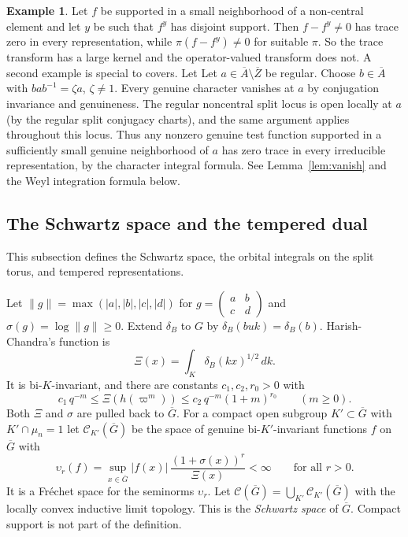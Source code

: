 \documentclass[12pt,letterpaper]{article}
\numberwithin{equation}{section}
\theoremstyle{definition}
\newtheorem{xexample}[theorem]{Example}
\newcommand{\vp}{\varpi}
\newcommand{\bG}{\overline{G}}
\newcommand{\bA}{\overline{A}}
\newcommand{\bZ}{\overline{Z}}
\newcommand{\calC}{\mathcal C}
\begin{document}
\begin{xexample}\label{ex:kernels}
Let $f$ be supported in a small neighborhood of a non-central element and let $y$ be such
that $f^y$ has disjoint support.  Then $f-f^y\ne0$ has trace zero in every representation,
while $\pi(f-f^y)\ne0$ for suitable $\pi$.  So the trace transform has a large kernel and
the operator-valued transform does not.  A second example is special to covers.  Let
Let $a\in\bA\setminus\bZ$ be regular. Choose $b\in\bA$ with
$bab^{-1}=\zeta a$, $\zeta\ne1$. Every genuine character vanishes at $a$
by conjugation invariance and genuineness. The regular noncentral split locus
is open locally at $a$ (by the regular split conjugacy charts), and the same
argument applies throughout this locus. Thus any nonzero genuine test function
supported in a sufficiently small genuine neighborhood of $a$ has zero trace
in every irreducible representation, by the character integral formula.
See Lemma~\ref{lem:vanish} and the Weyl integration formula below.
\end{xexample}

\subsection{The Schwartz space and the tempered dual}\label{subsec:schwartz}

This subsection defines the Schwartz space, the orbital integrals on the split torus, and
tempered representations.

Let $\|g\|=\max(|a|,|b|,|c|,|d|)$ for $g=\begin{pmatrix}a&b\\c&d\end{pmatrix}$ and
$\sigma(g)=\log\|g\|\ge0$.  Extend $\delta_B$ to $G$ by $\delta_B(buk)=\delta_B(b)$.
Harish-Chandra's function is
\[
\Xi(x)=\int_K\delta_B(kx)^{1/2}\,dk .
\]
It is bi-$K$-invariant, and there are constants $c_1,c_2,r_0>0$ with
\[
c_1\,q^{-m}\le\Xi(h(\vp^m))\le c_2\,q^{-m}(1+m)^{r_0}\qquad(m\ge0).
\]
Both $\Xi$ and $\sigma$ are pulled back to $\bG$.  For a compact open subgroup
$K'\subset\bG$ with $K'\cap\mu_n=1$ let $\calC_{K'}(\bG)$ be the space of genuine
bi-$K'$-invariant functions $f$ on $\bG$ with
\[
\upsilon_r(f)=\sup_{x\in\bG}|f(x)|\,\frac{(1+\sigma(x))^r}{\Xi(x)}<\infty\qquad\text{for all }r>0 .
\]
It is a Fr\'echet space for the seminorms $\upsilon_r$.  Let
$\calC(\bG)=\bigcup_{K'}\calC_{K'}(\bG)$ with the locally convex inductive limit topology.
This is the \emph{Schwartz space} of $\bG$.  Compact support is not part of the definition.
\end{document}
